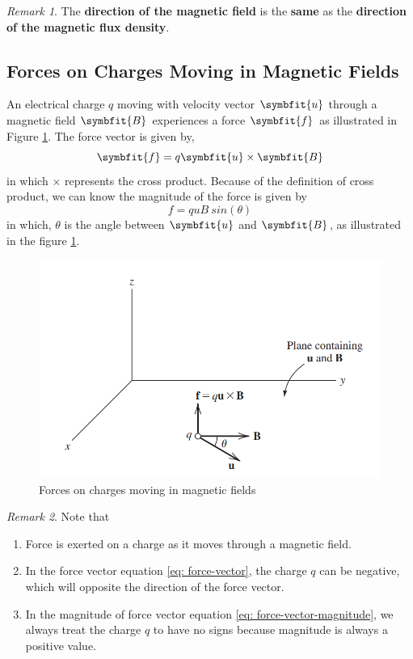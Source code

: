 \documentclass[math,code]{amznotes}
\theoremstyle{remark}
\newtheorem*{remark}{Remark}
\begin{document}
\begin{notebox}
    \begin{remark}
        The \textbf{direction of the magnetic field} is the {\color{red} \textbf{same}} as the \textbf{direction of the magnetic flux density}.
    \end{remark}
\end{notebox}
\subsection{Forces on Charges Moving in Magnetic Fields}
An electrical charge $q$ moving with velocity vector $\symbfit{u}$ through a magnetic field $\symbfit{B}$ experiences a force $\symbfit{f}$ as illustrated in Figure \ref{fig:forces-on-moving-charges-in-magnetic-fields}. The force vector is given by,
\begin{equation} \label{eq: force-vector}
    \symbfit{f} = q\symbfit{u} \times \symbfit{B}
\end{equation}
in which $\times$ represents the cross product. Because of the definition of cross product, we can know the magnitude of the force is given by
\begin{equation} \label{eq: force-vector-magnitude}
    f=quB~sin(\theta)
\end{equation}
in which, $\theta$ is the angle between $\symbfit{u}$ and $\symbfit{B}$, as illustrated in the figure \ref{fig:forces-on-moving-charges-in-magnetic-fields}.
\begin{figure}[H]
    \centering
    \includegraphics[width=0.5\linewidth]{images/forces-on-moving-charges-in-magnetic-fields.png}
    \caption{Forces on charges moving in magnetic fields}
    \label{fig:forces-on-moving-charges-in-magnetic-fields}
\end{figure}
\begin{notebox}
    \begin{remark}
    Note that
    \begin{enumerate}
        \item Force is exerted on a charge as it moves through a magnetic field.
        \item In the force vector equation \eqref{eq: force-vector}, the charge $q$ can be negative, which will opposite the direction of the force vector.
        \item In the magnitude of force vector equation \eqref{eq: force-vector-magnitude}, we always treat the charge $q$ to have no signs because magnitude is always a positive value.
    \end{enumerate}
    \end{remark}
\end{notebox}
\end{document}
